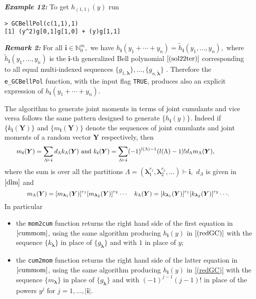 \hskip-0.5cm\textbf{\emph{Example 12:}} To get \(h_{(1,1)}(y)\) run

\begin{verbatim}
> GCBellPol(c(1,1),1)
[1] (y^2)g[0,1]g[1,0] + (y)g[1,1]
\end{verbatim}

\hskip-0.5cm\textbf{\emph{Remark 2:}} For all
\(\boldsymbol{i} \in {\mathbb N}_0^m,\) we have
\(h_{\boldsymbol{i}}(y_1 + \cdots + y_n)= \tilde{h}_{\boldsymbol{i}}(y_1, \ldots, y_n),\)
where \(\tilde{h}_{\boldsymbol{i}}(y_1, \ldots, y_n)\) is the
\(\boldsymbol{i}\)-th generalized Bell polynomial \(\eqref{(sol22ter)}\)
corresponding to all equal multi-indexed sequences
\(\{ g_{1, \boldsymbol{\lambda}}\}, \ldots, \{ g_{n, \boldsymbol{\tilde{\lambda}}}\}\)
\citep{MR3437172}. Therefore the \texttt{e\_GCBellPol} function, with
the input flag \texttt{TRUE}, produces also an explicit expression of
\(h_{\boldsymbol{i}}(y_1 + \cdots + y_n).\)

The algorithm to generate joint moments in terms of joint cumulants and
vice versa follows the same pattern designed to generate
\(\{h_{\boldsymbol{i}}(y)\}.\) Indeed if
\(\{k_{\boldsymbol{i}}(\boldsymbol{Y})\}\) and
\(\{m_{\boldsymbol{i}}(\boldsymbol{Y})\}\) denote the sequences of joint
cumulants and joint moments of a random vector \(\boldsymbol{Y}\)
respectively, then \begin{equation}\label{cummom}
\hskip-1.3cm{\small m_{\boldsymbol{i}}(\boldsymbol{Y}) = \sum_{{\Lambda} \vdash  \boldsymbol{i}} d_{\Lambda} k_{\Lambda}(\boldsymbol{Y}) \,\,  \hbox{and} \,\, k_{\boldsymbol{i}}(\boldsymbol{Y}) = \sum_{{\Lambda} \vdash  \boldsymbol{i}} (-1)^{l(\Lambda)-1} (l(\Lambda)-1)! d_{\Lambda} m_{\Lambda}(\boldsymbol{Y})},
\end{equation} where the sum is over all the partitions
\(\Lambda=(\boldsymbol{\lambda}_1^{r_1} , \boldsymbol{\lambda}_2^{r_2}, \ldots) \vdash \boldsymbol{i},\)
\(d_{\Lambda}\) is given in \(\eqref{dlm}\) and
\[{\small m_{\Lambda}(\boldsymbol{Y})= [m_{{\boldsymbol{\lambda}}_1}(\boldsymbol{Y})]^{r_1} [m_{{\boldsymbol{\lambda}}_2}(\boldsymbol{Y})]^{r_2} \cdots \quad k_{\Lambda}(\boldsymbol{Y})= [k_{{\boldsymbol{\lambda}}_1}(\boldsymbol{Y})]^{r_1} [k_{{\boldsymbol{\lambda}}_2}(\boldsymbol{Y})]^{r_2} \cdots}.\]
In particular

\begin{itemize}
\item
  the \texttt{mom2cum} function returns the right hand side of the first
  equation in \(\eqref{cummom}\), using the same algorithm producing
  \(h_{\boldsymbol{i}}(y)\) in \(\eqref{(redGC)}\) with the sequence
  \(\{k_{\boldsymbol{\lambda}}\}\) in place of
  \(\{g_{\boldsymbol{\lambda}}\}\) and with \(1\) in place of \(y;\)
\item
  the \texttt{cum2mom} function returns the right hand side of the
  latter equation in \(\eqref{cummom}\), using the same algorithm
  producing \(h_{\boldsymbol{i}}(y)\) in \eqref{(redGC)} with the
  sequence \(\{m_{\boldsymbol{\lambda}}\}\) in place of
  \(\{g_{\boldsymbol{\lambda}}\}\) and with \((-1)^{j-1} (j-1)!\) in
  place of the powers \(y^j\) for \(j=1,\ldots,|\boldsymbol{i}|.\)
\end{itemize}

